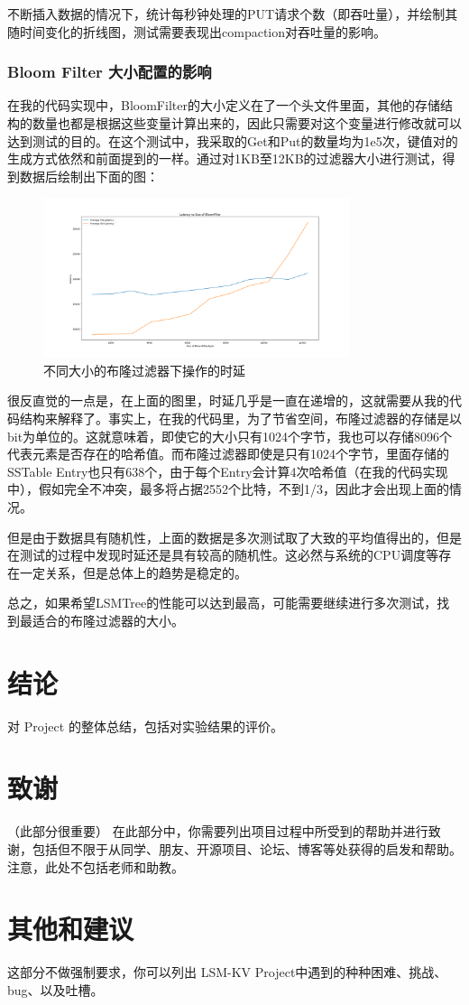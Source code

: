 \documentclass{article}
\begin{document}
不断插入数据的情况下，统计每秒钟处理的PUT请求个数（即吞吐量），并绘制其随时间变化的折线图，测试需要表现出compaction对吞吐量的影响。

\subsubsection{Bloom Filter 大小配置的影响}

在我的代码实现中，BloomFilter的大小定义在了一个头文件里面，其他的存储结构的数量也都是根据这些变量计算出来的，因此只需要对这个变量进行修改就可以达到测试的目的。在这个测试中，我采取的Get和Put的数量均为1e5次，键值对的生成方式依然和前面提到的一样。通过对1KB至12KB的过滤器大小进行测试，得到数据后绘制出下面的图：

\begin{figure}[h]
    \centering
    \includegraphics[width=0.8\textwidth]{images/filter.png}
    \caption{不同大小的布隆过滤器下操作的时延}
    \label{filter}
\end{figure}

很反直觉的一点是，在上面的图里，时延几乎是一直在递增的，这就需要从我的代码结构来解释了。事实上，在我的代码里，为了节省空间，布隆过滤器的存储是以bit为单位的。这就意味着，即使它的大小只有1024个字节，我也可以存储8096个代表元素是否存在的哈希值。而布隆过滤器即使是只有1024个字节，里面存储的SSTable Entry也只有638个，由于每个Entry会计算4次哈希值（在我的代码实现中），假如完全不冲突，最多将占据2552个比特，不到1/3，因此才会出现上面的情况。

但是由于数据具有随机性，上面的数据是多次测试取了大致的平均值得出的，但是在测试的过程中发现时延还是具有较高的随机性。这必然与系统的CPU调度等存在一定关系，但是总体上的趋势是稳定的。

总之，如果希望LSMTree的性能可以达到最高，可能需要继续进行多次测试，找到最适合的布隆过滤器的大小。

\section{结论}

对 Project 的整体总结，包括对实验结果的评价。

\section{致谢}

（此部分很重要）
在此部分中，你需要列出项目过程中所受到的帮助并进行致谢，包括但不限于从同学、朋友、开源项目、论坛、博客等处获得的启发和帮助。注意，此处不包括老师和助教。


\section{其他和建议}
这部分不做强制要求，你可以列出 LSM-KV Project中遇到的种种困难、挑战、bug、以及吐槽。



\end{document}
